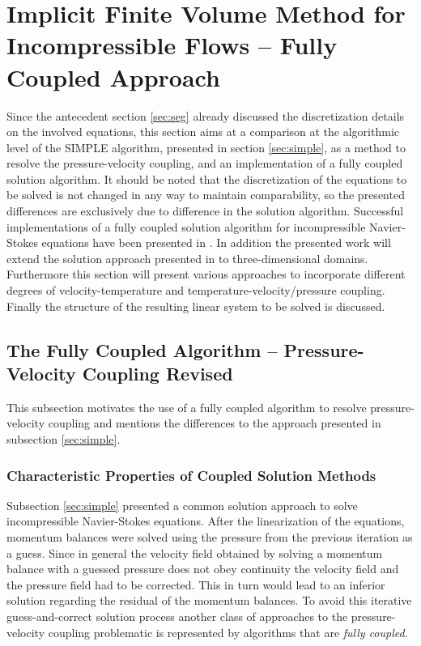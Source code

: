 \section{Implicit Finite Volume Method for Incompressible Flows -- Fully Coupled Approach}

Since the antecedent section \ref{sec:seg} already discussed the discretization details on the involved equations, this section aims at a comparison at the algorithmic level of the SIMPLE algorithm, presented in section \ref{sec:simple}, as a method to resolve the pressure-velocity coupling, and an implementation of a fully coupled solution algorithm. It should be noted that the discretization of the equations to be solved is not changed in any way to maintain comparability, so the presented differences are exclusively due to difference in the solution algorithm. Successful implementations of a fully coupled solution algorithm for incompressible Navier-Stokes equations have been presented in \cite{chen10,darwish09,falk13,vakilipour12}. In addition the presented work will extend the solution approach presented in \cite{falk13} to three-dimensional domains. Furthermore this section will present various approaches to incorporate different degrees of velocity-temperature and temperature-velocity/pressure coupling. Finally the structure of the resulting linear system to be solved is discussed.

\subsection{The Fully Coupled Algorithm -- Pressure-Velocity Coupling Revised}

This subsection motivates the use of a fully coupled algorithm to resolve pressure-velocity coupling and mentions the differences to the approach presented in subsection \ref{sec:simple}.
      
\subsubsection{Characteristic Properties of Coupled Solution Methods}

Subsection \ref{sec:simple} presented a common solution approach to solve incompressible Navier-Stokes equations. After the linearization of the equations, momentum balances were solved using the pressure from the previous iteration as a guess. Since in general the velocity field obtained by solving a momentum balance with a guessed pressure does not obey continuity the velocity field and the pressure field had to be corrected. This in turn would lead to an inferior solution regarding the residual of the momentum balances. To avoid this iterative guess-and-correct solution process another class of approaches to the pressure-velocity coupling problematic is represented by algorithms that are \emph{fully coupled}. 

